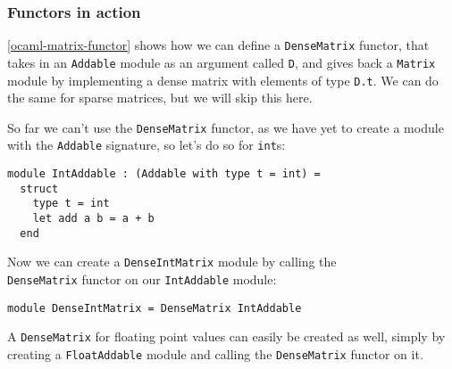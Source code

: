 \subsubsection{Functors in action}

\autoref{ocaml-matrix-functor} shows how we can define a \verb|DenseMatrix| functor, that takes in an \verb|Addable| module as an argument called \verb|D|, and gives back a \verb|Matrix| module by implementing a dense matrix with elements of type \verb|D.t|. We can do the same for sparse matrices, but we will skip this here.

So far we can't use the \verb|DenseMatrix| functor, as we have yet to create a module with the \verb|Addable| signature, so let's do so for \verb|int|s:
\newpage
\begin{verbatim}
module IntAddable : (Addable with type t = int) =
  struct
    type t = int
    let add a b = a + b
  end
\end{verbatim}
Now we can create a \verb|DenseIntMatrix| module by calling the \\ \verb|DenseMatrix| functor on our \verb|IntAddable| module:
\begin{verbatim}
module DenseIntMatrix = DenseMatrix IntAddable
\end{verbatim}
A \verb|DenseMatrix| for floating point values can easily be created as well, simply by creating a \verb|FloatAddable| module and calling the \verb|DenseMatrix| functor on it.
